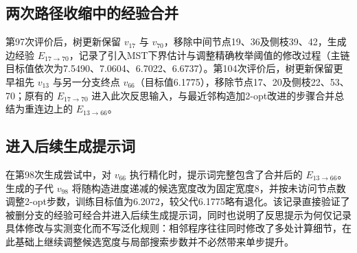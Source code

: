 \documentclass{article}
\begin{document}
\subsection{两次路径收缩中的经验合并}\label{ux4e24ux6b21ux8defux5f84ux6536ux7f29ux4e2dux7684ux7ecfux9a8cux5408ux5e76}

第97次评价后，树更新保留 \(v_{17}\) 与 \(v_{70}\)，移除中间节点19、36及侧枝39、42，生成边经验 \(E_{17\to70}\)，记录了引入MST下界估计与调整精确枚举阈值的修改过程（主链目标值依次为7.5490、7.0604、6.7022、6.6737）。第104次评价后，树更新保留更早祖先 \(v_{13}\) 与另一分支终点 \(v_{66}\)（目标值6.1775），移除节点17、20及侧枝22、53、70；原有的 \(E_{17\to70}\) 进入此次反思输入，与最近邻构造加2-opt改进的步骤合并总结为重连边上的 \(E_{13\to66}\)。

\subsection{进入后续生成提示词}\label{ux8fdbux5165ux540eux7eedux751fux6210ux63d0ux793aux8bcd}

在第98次生成尝试中，对 \(v_{66}\) 执行精化时，提示词完整包含了合并后的 \(E_{13\to66}\)。生成的子代 \(v_{98}\) 将随构造进度递减的候选宽度改为固定宽度8，并按未访问节点数调整2-opt步数，训练目标值为6.2072，较父代6.1775略有退化。该记录直接验证了被删分支的经验可经合并进入后续生成提示词，同时也说明了反思提示为何仅记录具体修改与实测变化而不写泛化规则：相邻程序往往同时修改了多处计算细节，在此基础上继续调整候选宽度与局部搜索步数并不必然带来单步提升。
\end{document}
